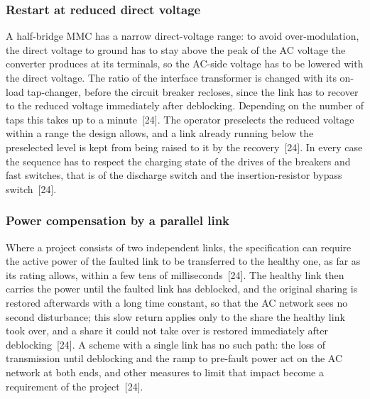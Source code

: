 \subsubsection{Restart at reduced direct voltage}
\label{sec:dcf-sequence-reduced}

A half-bridge MMC has a narrow direct-voltage range: to avoid
over-modulation, the direct voltage to ground has to stay above the peak of
the AC voltage the converter produces at its terminals, so the AC-side
voltage has to be lowered with the direct voltage. The ratio of the
interface transformer is changed with its on-load tap-changer, before the
circuit breaker recloses, since the link has to recover to the reduced
voltage immediately after deblocking. Depending on the number of taps this
takes up to a minute~[24]. The operator preselects the reduced voltage
within a range the design allows, and a link already running below the
preselected level is kept from being raised to it by the recovery~[24]. In
every case the sequence has to respect the charging state of the drives of
the breakers and fast switches, that is of the discharge switch and the
insertion-resistor bypass switch~[24].

\subsubsection{Power compensation by a parallel link}
\label{sec:dcf-sequence-compensation}

Where a project consists of two independent links, the specification can
require the active power of the faulted link to be transferred to the
healthy one, as far as its rating allows, within a few tens of
milliseconds~[24]. The healthy link then carries the power until the faulted
link has deblocked, and the original sharing is restored afterwards with a
long time constant, so that the AC network sees no second disturbance; this
slow return applies only to the share the healthy link took over, and a
share it could not take over is restored immediately after
deblocking~[24]. A scheme with a single link has no such path: the loss of
transmission until deblocking and the ramp to pre-fault power act on the AC
network at both ends, and other measures to limit that impact become a
requirement of the project~[24].

\FloatBarrier
